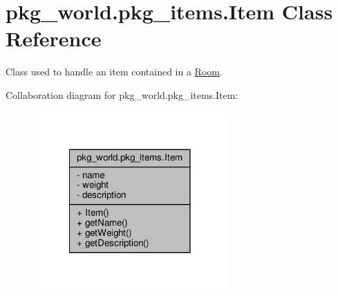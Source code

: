 \hypertarget{classpkg__world_1_1pkg__items_1_1Item}{\section{pkg\-\_\-world.\-pkg\-\_\-items.\-Item Class Reference}
\label{classpkg__world_1_1pkg__items_1_1Item}
}


Class used to handle an item contained in a \hyperlink{classpkg__world_1_1Room}{Room}.  




Collaboration diagram for pkg\-\_\-world.\-pkg\-\_\-items.\-Item\-:
\nopagebreak
\begin{figure}[H]
\begin{center}
\leavevmode
\includegraphics[width=210pt]{classpkg__world_1_1pkg__items_1_1Item__coll__graph}
\end{center}
\end{figure}
